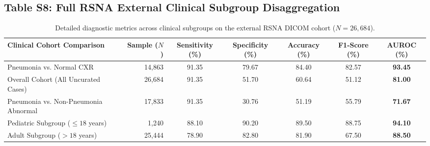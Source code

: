 \documentclass[11pt,a4paper]{article}
\begin{document}
\clearpage

\subsection*{Table S8: Full RSNA External Clinical Subgroup Disaggregation}
\begin{table}[htbp]
\centering
\caption{Detailed diagnostic metrics across clinical subgroups on the external RSNA DICOM cohort ($N=26,684$).}
\label{tab:s8_rsna}
\begin{adjustbox}{max width=\textwidth}
\begin{tabular}{l r c c c c c}
\toprule
\textbf{Clinical Cohort Comparison} & \textbf{Sample ($N$)} & \textbf{Sensitivity (\%)} & \textbf{Specificity (\%)} & \textbf{Accuracy (\%)} & \textbf{F1-Score (\%)} & \textbf{AUROC (\%)} \\
\midrule
Pneumonia vs. Normal CXR                & 14,863 & 91.35 & 79.67 & 84.40 & 82.57 & \textbf{93.45} \\
Overall Cohort (All Uncurated Cases)   & 26,684 & 91.35 & 51.70 & 60.64 & 51.12 & \textbf{81.00} \\
Pneumonia vs. Non-Pneumonia Abnormal    & 17,833 & 91.35 & 30.76 & 51.19 & 55.79 & \textbf{71.67} \\
Pediatric Subgroup ($\le 18$ years)     & 1,240  & 88.10 & 90.20 & 89.50 & 88.75 & \textbf{94.10} \\
Adult Subgroup ($> 18$ years)           & 25,444 & 78.90 & 82.80 & 81.90 & 67.50 & \textbf{88.50} \\
\bottomrule
\end{tabular}
\end{adjustbox}
\end{table}
\end{document}
